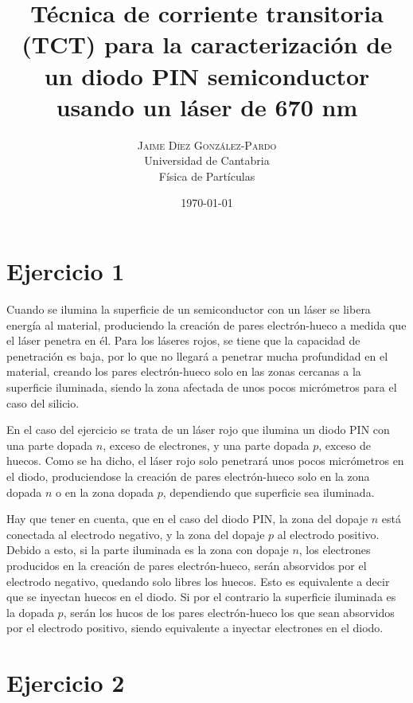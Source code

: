 \documentclass[twoside]{article}
\title{
	\vspace{-15mm}
	\fontsize{18pt}{10pt}
	\selectfont\textbf{Técnica de corriente transitoria (TCT) para la caracterización de un diodo PIN semiconductor usando un láser de 670 nm}%
}
\author{
	\large
	\textsc{Jaime D\'iez Gonz\'alez-Pardo}\\[4mm]
	\fontsize{28pt}{10pt} Universidad de Cantabria \\ %
	\normalsize Física de Partículas \\ 
}
\date{ \today }
\begin{document}
	\maketitle %


	\thispagestyle{fancy} %



	\section{Ejercicio 1}
		\label{sec:ej1}
						 
		Cuando se ilumina la superficie de un semiconductor con un láser se libera energía al material, produciendo la creación de pares electrón-hueco a medida que el láser penetra en él. Para los láseres rojos, se tiene que la  capacidad de penetración es baja, por lo que no llegará a penetrar mucha profundidad en el material, creando los pares electrón-hueco solo en las zonas cercanas a la superficie iluminada, siendo la zona afectada de unos pocos micrómetros para el caso del silicio. 

		En el caso del ejercicio se trata de un láser rojo que ilumina un diodo PIN con una parte dopada $n$, exceso de electrones, y una parte dopada $p$, exceso de huecos. Como se ha dicho, el láser rojo solo penetrará unos pocos micrómetros en el diodo, produciendose la creación de pares electrón-hueco solo en la zona dopada $n$ o en la zona dopada $p$, dependiendo que superficie sea iluminada.

		Hay que tener en cuenta, que en el caso del diodo PIN, la zona del dopaje $n$ está conectada al electrodo negativo, y la zona del dopaje $p$ al electrodo positivo. Debido a esto, si la parte iluminada es la zona con dopaje $n$, los electrones producidos en la creación de pares electrón-hueco, serán absorvidos por el electrodo negativo, quedando solo libres los huecos. Esto es equivalente a decir que se inyectan huecos en el diodo. Si por el contrario la superficie iluminada es la dopada $p$, serán los hucos de los pares electrón-hueco los que sean absorvidos por el electrodo positivo, siendo equivalente a inyectar electrones en el diodo.

	\section{Ejercicio 2}
\end{document}
